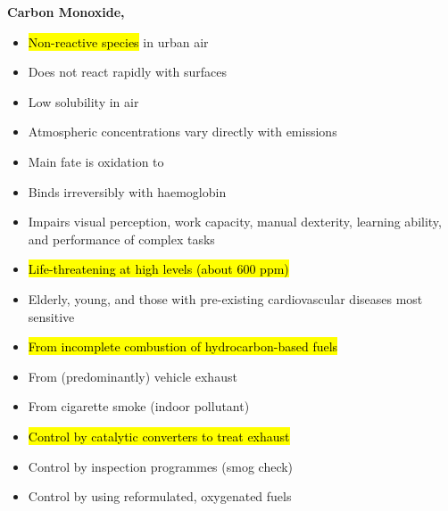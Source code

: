 \documentclass{article}
\newcommand{\headingsmall}[1]{{\small\textbf{#1}}}
\begin{document}
\begin{multicols*}{4}
\headingsmall{Carbon Monoxide, }
\begin{itemize} \itemsep -0.5em
    \item \hl{Non-reactive species} in urban air
    \item Does not react rapidly with surfaces
    \item Low solubility in air
    \item Atmospheric concentrations vary directly with emissions
    \item Main fate is oxidation to 
    \item Binds irreversibly with haemoglobin
    \item Impairs visual perception, work capacity, manual dexterity, 
        learning ability, and performance of complex tasks
    \item \hl{Life-threatening at high levels (about 600 ppm)}
    \item Elderly, young, and those with pre-existing cardiovascular diseases most
        sensitive
    \item \hl{From incomplete combustion of hydrocarbon-based fuels}
    \item From (predominantly) vehicle exhaust
    \item From cigarette smoke (indoor pollutant)
    \item \hl{Control by catalytic converters to treat exhaust}
    \item Control by inspection programmes (smog check)
    \item Control by using reformulated, oxygenated fuels
\end{itemize}


\end{multicols*}
\end{document}
